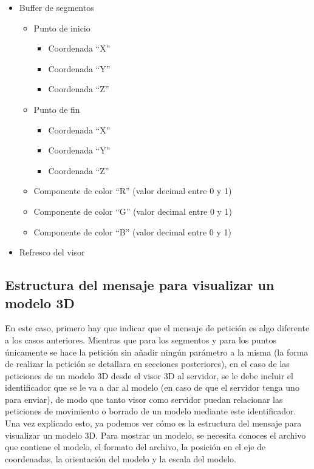 \begin{itemize}
	\item Buffer de segmentos
	\begin{itemize}
		\item Punto de inicio
		\begin{itemize}
			\item Coordenada ``X''
			\item Coordenada ``Y''
			\item Coordenada ``Z''
		\end{itemize}
		\item Punto de fin
		\begin{itemize}
			\item Coordenada ``X''
			\item Coordenada ``Y''
			\item Coordenada ``Z''
		\end{itemize}
		\item Componente de color ``R'' (valor decimal entre 0 y 1)
		\item Componente de color ``G'' (valor decimal entre 0 y 1)
		\item Componente de color ``B'' (valor decimal entre 0 y 1)
	\end{itemize}
	\item Refresco del visor
\end{itemize}

\subsection{Estructura del mensaje para visualizar un modelo 3D}
En este caso, primero hay que indicar que el mensaje de petición es algo diferente a los casos anteriores. Mientras que para los segmentos y para los puntos únicamente se hace la petición sin añadir ningún parámetro a la misma (la forma de realizar la petición se detallara en secciones posteriores), en el caso de las peticiones de un modelo 3D desde el visor 3D al servidor, se le debe incluir el identificador que se le va a dar al modelo (en caso de que el servidor tenga uno para enviar), de modo que tanto visor como servidor puedan relacionar las peticiones de movimiento o borrado de un modelo mediante este identificador.
Una vez explicado esto, ya podemos ver cómo es la estructura del mensaje para visualizar un modelo 3D. Para mostrar un modelo, se necesita conoces el archivo que contiene el modelo, el formato del archivo, la posición en el eje de coordenadas, la orientación del modelo y la escala del modelo. 

